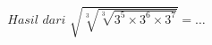 \documentclass[preview]{standalone}
\begin{document}
\begin{align*}
Hasil \,\, dari\,\, \displaystyle \sqrt{\sqrt[3]{\sqrt[3]{3^5 \times 3^6 \times 3^7}}} =\dots
\end{align*}
\end{document}
